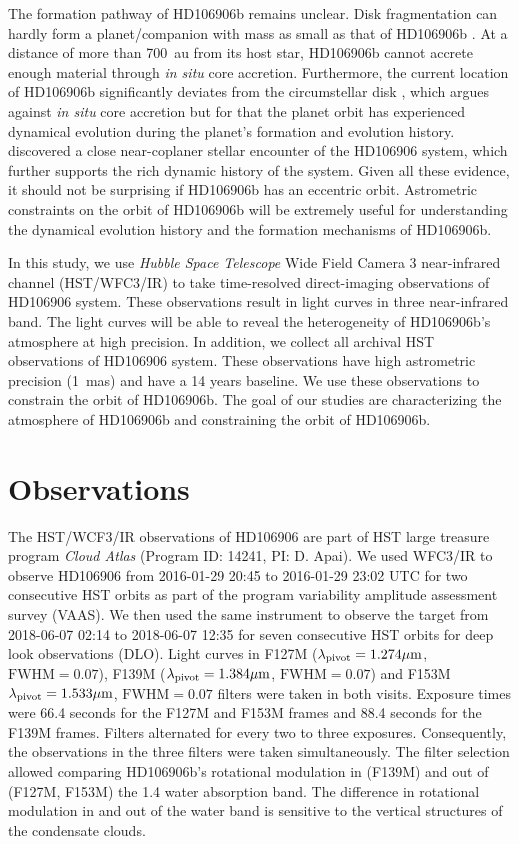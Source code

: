 \documentclass[twocolumn]{aastex62}
\begin{document}
The formation pathway of HD106906b remains unclear. Disk fragmentation can hardly form a planet/companion with mass as small as that of HD106906b \citep[e.g.,][]{Kratter2010}. At a distance of more than 700~au from its host star, HD106906b cannot accrete enough material through \emph{in situ} core accretion. Furthermore, the current location of HD106906b significantly deviates from the circumstellar disk \citep{Bailey2013,Kalas2015}, which argues against \emph{in situ} core accretion but for that the planet orbit has experienced dynamical evolution during the planet's formation and evolution history. \citep{DeRosa2019} discovered a close near-coplaner stellar encounter of the HD106906 system, which further supports the rich dynamic history of the system. Given all these evidence, it should not be surprising if HD106906b has an eccentric orbit. Astrometric constraints on the orbit of HD106906b will be extremely useful for understanding the dynamical evolution history and the formation mechanisms of HD106906b.

In this study, we use \emph{Hubble Space Telescope} Wide Field Camera 3 near-infrared channel (HST/WFC3/IR) to take time-resolved direct-imaging observations of HD106906 system. These observations result in light curves in three near-infrared band. The light curves will be able to reveal the heterogeneity of HD106906b's atmosphere at high precision. In addition, we collect all archival HST observations of HD106906 system. These observations have high astrometric precision (1~mas) and have a 14 years baseline. We use these observations to constrain the orbit of HD106906b. The goal of our studies are  characterizing the atmosphere of HD106906b and constraining the orbit of HD106906b.

\section{Observations}
The HST/WCF3/IR observations of HD106906 are part of HST large treasure program \emph{Cloud Atlas} (Program ID: 14241, PI: D. Apai). We used WFC3/IR to observe HD106906 from 2016-01-29 20:45 to 2016-01-29 23:02 UTC for two consecutive HST orbits as part of the program variability amplitude assessment survey (VAAS). We then used the same instrument to observe the target from 2018-06-07 02:14 to 2018-06-07 12:35 for seven consecutive HST orbits for deep look observations (DLO). Light curves in F127M ($\lambda_{\mathrm{pivot}}=1.274\mbox{$\mu$m}$, $\mathrm{FWHM}=0.07$), F139M ($\lambda_{\mathrm{pivot}}=1.384\mbox{$\mu$m}$, $\mathrm{FWHM}=0.07$) and F153M $\lambda_{\mathrm{pivot}}=1.533\mbox{$\mu$m}$, $\mathrm{FWHM}=0.07$ filters were taken in both visits. Exposure times were 66.4 seconds for the F127M and F153M frames and 88.4 seconds for the F139M frames. Filters alternated for every two to three exposures. Consequently, the observations in the three filters were taken simultaneously. The filter selection allowed comparing HD106906b's rotational modulation in (F139M) and out of (F127M, F153M) the 1.4 \micron water absorption band. The difference in rotational modulation in and out of the water band is sensitive to the vertical structures of the condensate clouds. 
\end{document}
